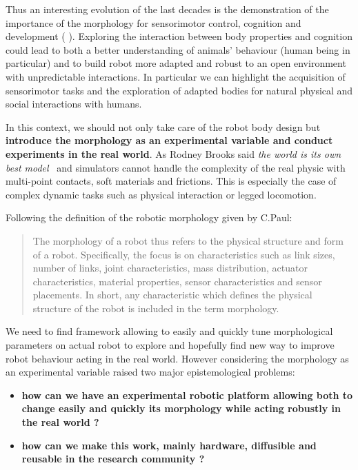 Thus an interesting evolution of the last decades is the demonstration of the importance of the morphology for sensorimotor control, cognition and development (\cite{kaplan2008corps} \cite{REF} \cite{REF}). Exploring the interaction between body properties and cognition could lead to both a better understanding of animals’ behaviour (human being in particular) and to build robot more adapted and robust to an open environment with unpredictable interactions. In particular we can highlight the acquisition of sensorimotor tasks and the exploration of adapted bodies for natural physical and social interactions with humans.

In this context, we should not only take care of the robot body design but \textbf{introduce the morphology as an experimental variable and conduct experiments in the real world}. As Rodney Brooks said \emph{the world is its own best model}~\cite{brooks1991intelligence} and simulators cannot handle the complexity of the real physic with multi-point contacts, soft materials and frictions. This is especially the case of complex dynamic tasks such as physical interaction or legged locomotion.


Following the definition of the robotic morphology given by C.Paul:
\begin{quotation}
    The morphology of a robot thus refers to the physical structure and form of a robot. Specifically, the focus is on characteristics such as link sizes, number of links, joint characteristics, mass distribution, actuator characteristics, material properties, sensor characteristics and sensor placements. In short, any characteristic which defines the physical structure of the robot is included in the term morphology.
\end{quotation}

We need to find framework allowing to easily and quickly tune morphological parameters on actual robot to explore and hopefully find new way to improve robot behaviour acting in the real world. However considering the morphology as an experimental variable raised two major epistemological problems:
\begin{itemize}
    \item \textbf{how can we have an experimental robotic platform allowing both to change easily and quickly its morphology while acting robustly in the real world ? }
    \item \textbf{how can we make this work, mainly hardware, diffusible and reusable in the research community ? }
\end{itemize}


